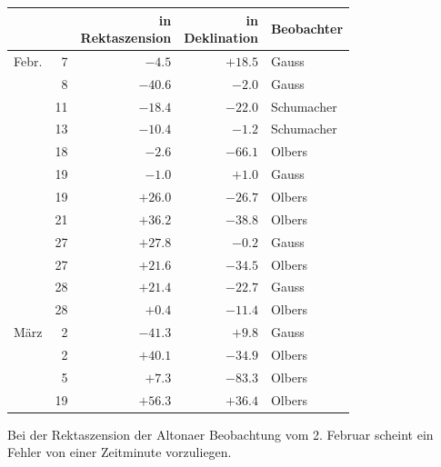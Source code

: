 \begin{center}
\begin{tabular}{lr|r|r|l}
 & & \shortstack{in\\Rektaszension} & \shortstack{in\\Deklination} & Beobachter \\
\hline
Febr. & 7 & $-4.5$ & $+18.5$ & Gauss \\
 & 8 & $-40.6$ & $-2.0$ & Gauss \\
 & 11 & $-18.4$ & $-22.0$ & Schumacher \\
 & 13 & $-10.4$ & $-1.2$ & Schumacher \\
 & 18 & $-2.6$ & $-66.1$ & Olbers \\
 & 19 & $-1.0$ & $+1.0$ & Gauss \\
 & 19 & $+26.0$ & $-26.7$ & Olbers \\
 & 21 & $+36.2$ & $-38.8$ & Olbers \\
 & 27 & $+27.8$ & $-0.2$ & Gauss \\
 & 27 & $+21.6$ & $-34.5$ & Olbers \\
 & 28 & $+21.4$ & $-22.7$ & Gauss \\
 & 28 & $+0.4$ & $-11.4$ & Olbers \\
März & 2 & $-41.3$ & $+9.8$ & Gauss \\
 & 2 & $+40.1$ & $-34.9$ & Olbers \\
 & 5 & $+7.3$ & $-83.3$ & Olbers \\
 & 19 & $+56.3$ & $+36.4$ & Olbers \\
\end{tabular}
\end{center}


Bei der Rektaszension der Altonaer Beobachtung vom 2. Februar scheint ein Fehler von einer Zeitminute vorzuliegen.

